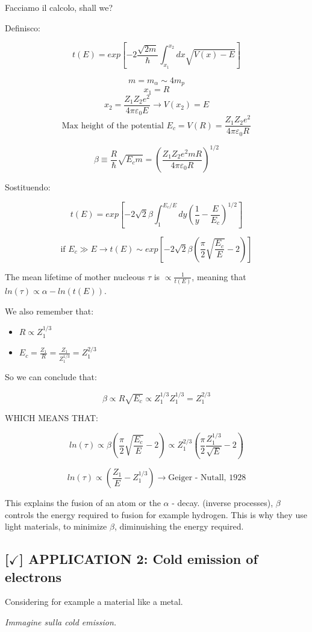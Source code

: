 Facciamo il calcolo, shall we?

Definisco:

$$t(E) = exp \left[ -2 \frac{\sqrt{2m}}{\hbar} \int_{x_1}^{x_2} dx \sqrt{V(x) - E} \right]$$

$$m = m_{\alpha} \sim 4m_p$$
$$x_1 = R$$
$$x_2 = \frac{Z_1Z_2e^2}{4\pi\varepsilon_0 E} \longrightarrow V(x_2) = E$$
$$\text{Max height of the potential } E_c = V(R) = \frac{Z_1Z_2e^2}{4\pi\varepsilon_0 R}$$

$$\beta \equiv \frac{R}{\hbar} \sqrt{E_cm} = \left( \frac{Z_1Z_2 e^2 mR}{4\pi\varepsilon_0R} \right)^{1/2}$$

Sostituendo:

$$t(E) = exp \left[ -2\sqrt{2} \beta \int_{1}^{E_c/E} dy \left(\frac{1}{y} - \frac{E}{E_c}\right)^{1/2} \right]$$

$$\text{if }E_c \gg E \rightarrow t(E) \sim exp \left[ -2\sqrt{2} \beta \left( \frac{\pi}{2} \sqrt{\frac{E_c}{E}} - 2  \right) \right]$$

The mean lifetime of mother nucleous $\tau$ is $\propto \frac{1}{t(E)}$, meaning that $ln(\tau) \propto \alpha - ln(t(E))$.

We also remember that:

\begin{itemize}
    \item $R \propto Z_1^{1/3}$
    \item $E_c = \frac{Z_1}{R} = \frac{Z_1}{Z_1^{1/3}} = Z_1^{2/3}$
\end{itemize}

So we can conclude that:

$$ \beta \propto R\sqrt{E_c} \propto Z_1^{1/3}Z_1^{1/3} = Z_1^{2/3} $$

WHICH MEANS THAT: 

$$ln(\tau) \propto \beta \left(\frac{\pi}{2} \sqrt{\frac{E_c}{E}} -2\right) \propto Z_1^{2/3} \left(\frac{\pi}{2}\frac{Z_1^{1/3}}{\sqrt{E}}-2\right)$$

$$ln(\tau) \propto \left(\frac{Z_1}{E} - Z_1^{1/3}\right) \longrightarrow \text{Geiger - Nutall, 1928}$$

This explains the fusion of an atom or the $\alpha$ - decay. (inverse processes), $\beta$ controls the energy required to fusion for example hydrogen. This is why they use light materials, to minimize $\beta$, diminuishing the energy required.

\subsection{[$\checkmark$] APPLICATION 2: Cold emission of electrons}

Considering for example a material like a metal.

\vspace{10pt}
\textit{Immagine sulla cold emission.}
\vspace{10pt}
